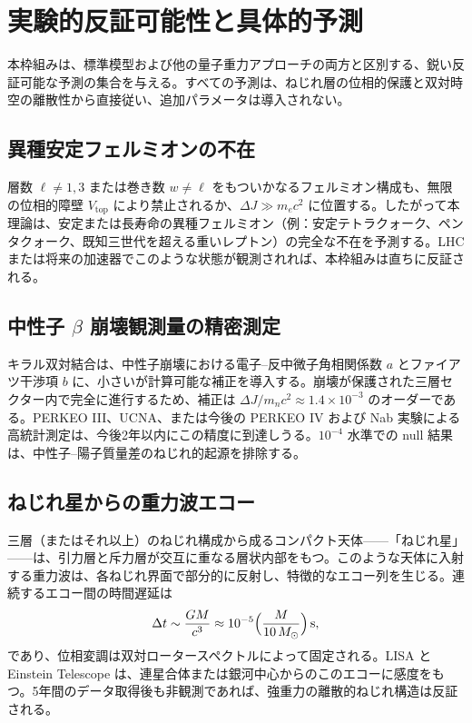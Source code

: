 \documentclass[a4paper]{article}
\begin{document}
\section{実験的反証可能性と具体的予測}

本枠組みは、標準模型および他の量子重力アプローチの両方と区別する、鋭い反証可能な予測の集合を与える。すべての予測は、ねじれ層の位相的保護と双対時空の離散性から直接従い、追加パラメータは導入されない。

\subsection{異種安定フェルミオンの不在}

層数 \(\ell \neq 1,3\) または巻き数 \(w \neq \ell\) をもついかなるフェルミオン構成も、無限の位相的障壁 \(V_\text{top}\) により禁止されるか、\(\Delta J \gg m_e c^2\) に位置する。したがって本理論は、安定または長寿命の異種フェルミオン（例：安定テトラクォーク、ペンタクォーク、既知三世代を超える重いレプトン）の完全な不在を予測する。LHC または将来の加速器でこのような状態が観測されれば、本枠組みは直ちに反証される。

\subsection{中性子 \texorpdfstring{$\beta$}{beta} 崩壊観測量の精密測定}

キラル双対結合は、中性子崩壊における電子--反中微子角相関係数 \(a\) とファイアツ干渉項 \(b\) に、小さいが計算可能な補正を導入する。崩壊が保護された三層セクター内で完全に進行するため、補正は \(\Delta J / m_n c^2 \approx 1.4 \times 10^{-3}\) のオーダーである。PERKEO III、UCNA、または今後の PERKEO IV および Nab 実験による高統計測定は、今後2年以内にこの精度に到達しうる。\(10^{-4}\) 水準での null 結果は、中性子--陽子質量差のねじれ的起源を排除する。

\subsection{ねじれ星からの重力波エコー}

三層（またはそれ以上）のねじれ構成から成るコンパクト天体——「ねじれ星」——は、引力層と斥力層が交互に重なる層状内部をもつ。このような天体に入射する重力波は、各ねじれ界面で部分的に反射し、特徴的なエコー列を生じる。連続するエコー間の時間遅延は
\[
\Delta t \sim \frac{GM}{c^3} \approx 10^{-5}\Bigl(\frac{M}{10\,M_\odot}\Bigr)\,\mathrm{s},
\]
であり、位相変調は双対ロータースペクトルによって固定される。LISA と Einstein Telescope は、連星合体または銀河中心からのこのエコーに感度をもつ。5年間のデータ取得後も非観測であれば、強重力の離散的ねじれ構造は反証される。
\end{document}
